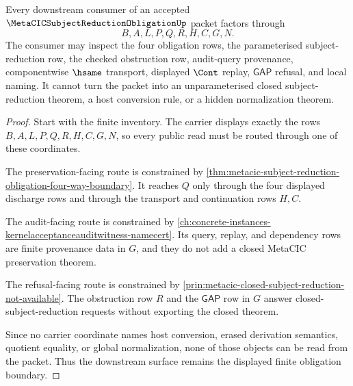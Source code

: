 \begin{theorem}
\label{thm:metacic-subject-reduction-obligation-nonescape}
Every downstream consumer of an accepted $\MetaCICSubjectReductionObligationUp$ packet factors through
$$
B,A,L,P,Q,R,H,C,G,N.
$$
The consumer may inspect the four obligation rows, the parameterised subject-reduction row, the checked obstruction row, audit-query provenance, componentwise $\hsame$ transport, displayed $\Cont$ replay, $\mathsf{GAP}$ refusal, and local naming. It cannot turn the packet into an unparameterised closed subject-reduction theorem, a host conversion rule, or a hidden normalization theorem.
\end{theorem}
\begin{proof}
Start with the finite inventory. The carrier displays exactly the rows $B,A,L,P,Q,R,H,C,G,N$, so every public read must be routed through one of these coordinates.

The preservation-facing route is constrained by \autoref{thm:metacic-subject-reduction-obligation-four-way-boundary}. It reaches $Q$ only through the four displayed discharge rows and through the transport and continuation rows $H,C$.

The audit-facing route is constrained by \autoref{ch:concrete-instances-kernelacceptanceauditwitness-namecert}. Its query, replay, and dependency rows are finite provenance data in $G$, and they do not add a closed MetaCIC preservation theorem.

The refusal-facing route is constrained by \autoref{prin:metacic-closed-subject-reduction-not-available}. The obstruction row $R$ and the $\mathsf{GAP}$ row in $G$ answer closed-subject-reduction requests without exporting the closed theorem.

Since no carrier coordinate names host conversion, erased derivation semantics, quotient equality, or global normalization, none of those objects can be read from the packet. Thus the downstream surface remains the displayed finite obligation boundary.
\end{proof}


